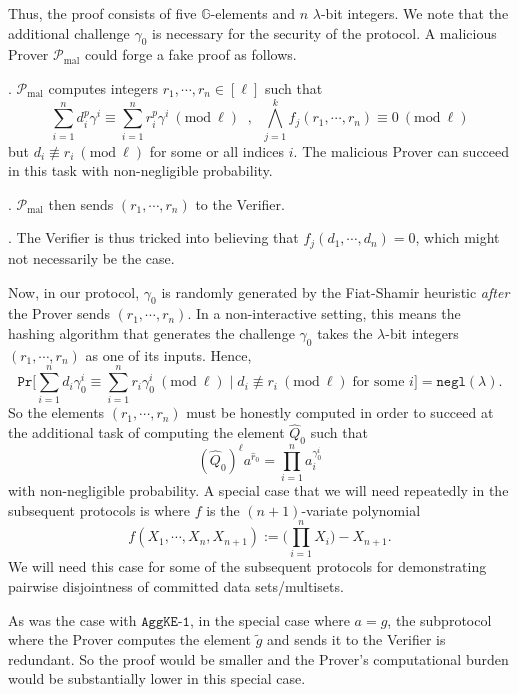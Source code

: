 \documentclass[11pt, lettersize, notitlepage, leqno, footskip=0.6cm]{article}
\newcommand{\pl}{\prod\limits}
\newcommand{\slim}{\sum\limits}
\newcommand{\ttt}{\texttt}
\newcommand{\negl}{\ttt{{negl}}}
\newcommand{\wti}{\widetilde}
\newcommand{\mc}{\mathcal}
\newcommand{\mb}{\mathbb}
\newcommand{\mr}{\mathrm}
\newcommand{\lam}{\lambda}
\newcommand{\what}{\widehat}
\newcommand{\mP}{\mc{P}}
\newcommand{\vs}{\vspace{-0.15cm}}
\newcommand{\noin}{\noindent}
\newcommand{\Mod}[1]{\ (\mathrm{mod}\ #1)}
\numberwithin{equation}{section}
\begin{document}
\vspace{0.1cm}

Thus, the proof consists of five $\mb{G}$-elements and $n$ $\lam$-bit integers. We note that the additional challenge $\gamma_{0}$ is necessary for the security of the protocol. A malicious Prover $\mP_{\mr{mal}}$ could forge a fake proof as follows.

\noin 1. $\mP_{\mr{mal}}$ computes integers $r_1,\cdots,r_n\in[\ell]$ such that \vs $$ \slim_{i=1}^n d_i^{p}\gamma^i\equiv\slim_{i=1}^n r_i^{p}\gamma^i\Mod{\ell} \;\;,\;\; \bigwedge\limits_{j=1}^k f_j(r_1,\cdots,r_n) \equiv 0\Mod{\ell}$$ but $d_i\not\equiv r_i\Mod{\ell}$ for some or all indices $i$. The malicious Prover can succeed in this task with non-negligible probability.

\noin 2. $\mP_{\mr{mal}}$ then sends $(r_1,\cdots,r_n)$ to the Verifier.

\noin 3. The Verifier is thus tricked into believing that $f_j(d_1,\cdots,d_n) = 0$, which might not necessarily be the case.

Now, in our protocol, $\gamma_{0}$ is randomly generated by the Fiat-Shamir heuristic \textit{after} the Prover sends $(r_1,\cdots,r_n)$. In a non-interactive setting, this means the hashing algorithm that generates the challenge $\gamma_{0}$ takes the $\lam$-bit integers $(r_1,\cdots,r_n)$ as one of its inputs. Hence, \vs $$\ttt{Pr}\Big[\slim_{i=1}^n d_i\gamma_{0}^i \equiv \slim_{i=1}^n r_i\gamma_{0}^i \Mod{\ell}\;\Big|\; d_i\not\equiv r_i\Mod{\ell}\;\text{for some } i\Big] = \negl(\lam). $$ So the elements $(r_1,\cdots,r_n)$ must be honestly computed in order to succeed at the additional task of computing the element $\what{Q}_0$ such that \vs $$(\what{Q}_0)^{\ell}a^{\what{r}_0} = \pl_{i=1}^{n} a_i^{\gamma_{0}^i} $$ with non-negligible probability. A special case that we will need repeatedly in the subsequent protocols is where $f$ is the $(n+1)$-variate polynomial \vs $$f(X_1,\cdots,X_n, X_{n+1}) := \big(\pl_{i=1}^n X_i \big)- X_{n+1}.$$ We will need this case for some of the subsequent protocols for demonstrating pairwise disjointness of committed data sets/multisets.

As was the case with $\ttt{AggKE-1}$, in the special case where $a = g$, the subprotocol where the Prover computes the element $\wti{g}$ and sends it to the Verifier is redundant. So the proof would be smaller and the Prover's computational burden would be substantially lower in this special case.


\vspace{0.2cm}
\end{document}
